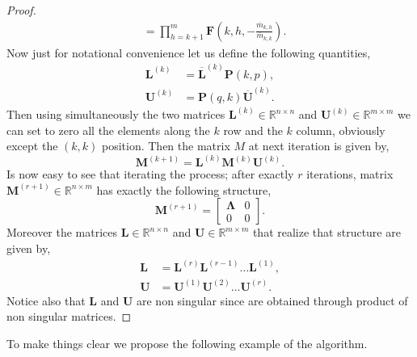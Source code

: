 \begin{proof}
\begin{equation}
\begin{split}
					&= \prod_{h=k+1}^{m} \bm{F}\left(k,h,-\frac{\overline{m}_{k,h}}{\overline{m}_{k,k}}\right).
				\end{split}
			\end{equation}
			Now just for notational convenience  let us define the following quantities, 
			\begin{subequations}
				\begin{align}
					\bm{L}^{(k)} &= \overline{\bm{L}}^{(k)}\bm{P}(k,p), \\
					\bm{U}^{(k)} &= \bm{P}(q,k)\overline{\bm{U}}^{(k)}.
				\end{align}
			\end{subequations}
			Then using simultaneously the two matrices $\bm{L}^{(k)}\in\mathbb{R}^{n\times n}$ and $\bm{U}^{(k)}\in\mathbb{R}^{m\times m}$ we can set to zero all the elements along the $k$ row and the $k$ column, obviously except the $(k,k)$ position. Then the matrix $M$ at next iteration is given by,
			\begin{equation}
				\bm{M}^{(k+1)} = \bm{L}^{(k)}\bm{M}^{(k)}\bm{U}^{(k)}.
			\end{equation}
			Is now easy to see that iterating the process; after exactly $r$ iterations, matrix $\bm{M}^{(r+1)}\in\mathbb{R}^{n\times m}$ has exactly the following structure,
			\begin{equation}
				\bm{M}^{(r+1)} = 
				\begin{bmatrix}
					\bm{\Lambda} & 0 \\
					0 		& 0 
				\end{bmatrix}.
			\end{equation}
			Moreover the matrices $\bm{L}\in\mathbb{R}^{n\times n}$ and $\bm{U}\in\mathbb{R}^{m\times m}$ that realize that structure are given by, 
			\begin{subequations}
				\begin{align}
					\bm{L} &= \bm{L}^{(r)}\bm{L}^{(r-1)}\dots\bm{L}^{(1)}, \\
					\bm{U} &= \bm{U}^{(1)}\bm{U}^{(2)}\dots \bm{U}^{(r)}.
				\end{align}
			\end{subequations}
			Notice also that $\bm{L}$ and $\bm{U}$ are non singular since are obtained through product of non singular matrices. 
		\end{proof}
		To make things clear we propose the following example of the algorithm.
